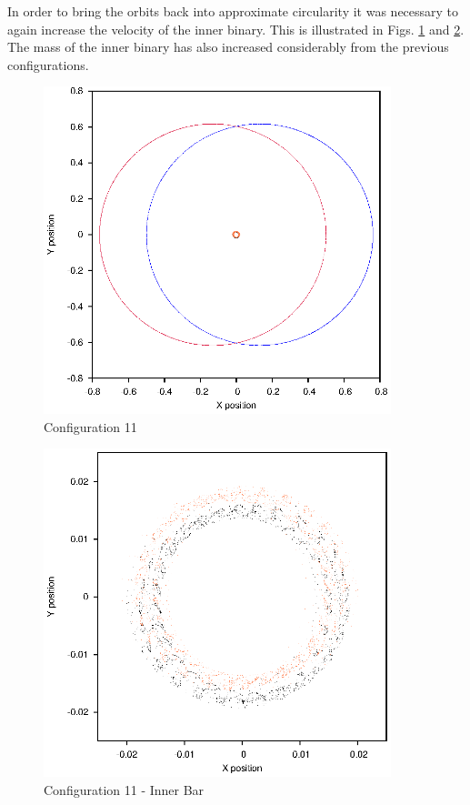 \documentclass[a4paper,12pt]{article}
\begin{document}
In order to bring the orbits back into approximate circularity it was necessary to again increase the velocity of the inner binary. This is illustrated
in Figs. \ref{fig:config11} and \ref{fig:config11i}. The mass of the inner binary has also increased considerably from the previous configurations.
\begin{figure}[H]
\centering
\includegraphics[width=0.9\textwidth]{./2016results/025-65-02/Orbit.eps}
\caption{Configuration 11}
\label{fig:config11}
\end{figure}
\begin{figure}[H]
\centering
\includegraphics[width=0.9\textwidth]{./2016results/025-65-02/Inner.eps}
\caption{Configuration 11 - Inner Bar}
\label{fig:config11i}
\end{figure}
\end{document}
